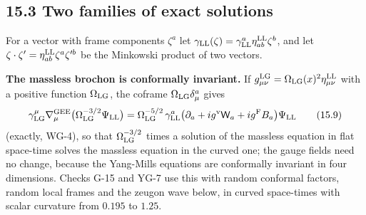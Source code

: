 \documentclass[
  10pt,
]{article}
\begin{document}
\hypertarget{two-families-of-exact-solutions}{%
\subsection{15.3 Two families of exact
solutions}\label{two-families-of-exact-solutions}}

For a vector with frame components \(\zeta^a\) let
\(\gamma_{\rm LL}(\zeta)=\gamma^a_{\rm LL}\eta^{\rm LL}_{ab}\zeta^b\),
and let \(\zeta\cdot\zeta'=\eta^{\rm LL}_{ab}\zeta^a\zeta'^b\) be the
Minkowski product of two vectors.

\textbf{The massless brochon is conformally invariant.} If
\(g^{\rm LG}_{\mu\nu}=\Omega_{\rm LG}(x)^2\eta^{\rm LL}_{\mu\nu}\) with
a positive function \(\Omega_{\rm LG}\), the coframe
\(\Omega_{\rm LG}\delta^a_\mu\) gives
\[\gamma^\mu_{\rm LG}\nabla^{\rm GEE}_\mu\big(\Omega_{\rm LG}^{-3/2}\Psi_{\rm LL}\big)=\Omega_{\rm LG}^{-5/2}\,\gamma^a_{\rm LL}\big(\partial_a+ig^{\rm v}\mathsf W_a+ig^{\rm F}B_a\big)\Psi_{\rm LL}\tag{15.9}\]
(exactly, WG-4), so that \(\Omega_{\rm LG}^{-3/2}\) times a solution of
the massless equation in flat space-time solves the massless equation in
the curved one; the gauge fields need no change, because the Yang-Mills
equations are conformally invariant in four dimensions. Checks G-15 and
YG-7 use this with random conformal factors, random local frames and the
zeugon wave below, in curved space-times with scalar curvature from
\(0.195\) to \(1.25\).
\end{document}
